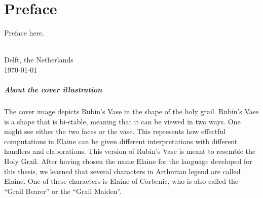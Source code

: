 \chapter{\label{chap:Preface}Preface}
Preface here.

\vspace{1cm}
\begin{flushright}
\theauthor{}\\
Delft, the Netherlands\\
\today{}\\
\end{flushright}

\vspace*{5em}
\paragraph{About the cover illustration} The cover image depicts Rubin's Vase in the shape of the holy grail. Rubin's Vase is a shape that is bi-stable, meaning that it can be viewed in two ways. One might see either the two faces or the vase. This represents how effectful computations in Elaine can be given different interpretations with different handlers and elaborations. This version of Rubin's Vase is meant to resemble the Holy Grail. After having chosen the name Elaine for the language developed for this thesis, we learned that several characters in Arthurian legend are called Elaine. One of these characters is Elaine of Corbenic, who is also called the ``Grail Bearer'' or the ``Grail Maiden''.
